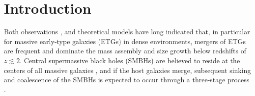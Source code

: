 \documentclass[twocolumn]{aastex631}
\begin{document}

\section{Introduction} \label{sec:intro}


Both observations \citep[e.g.][]{tran2005,trujillo2006,mcintosh2008,vandokkum2010,vanderwel2014}, and theoretical models \citep[e.g.][]{delucia2006,Naab2009,Johansson2012,laporte2013,behroozi2013,Rodriguez-Gomez2016,moster2018,moster2020} have long indicated that, in particular for massive early-type galaxies (ETGs) in dense environments, mergers of ETGs are frequent and dominate the mass assembly and size growth below redshifts of $z \lesssim 2$. Central supermassive black holes (SMBHs) are believed to reside 
at the centers of all massive galaxies \citep[e.g.][]{kormendy2013}, and if the host galaxies merge, subsequent sinking and coalescence of the SMBHs is expected to occur through a three-stage process \citep{begelman1980}. 
\end{document}
